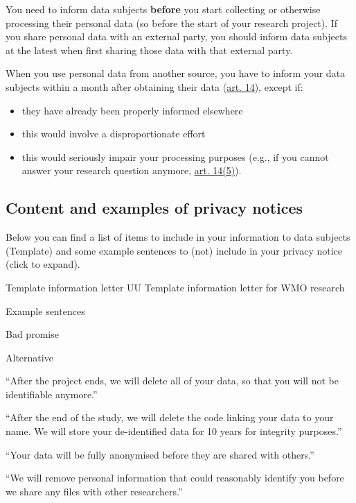\documentclass[
]{book}
\providecommand{\tightlist}{%
  \setlength{\itemsep}{0pt}\setlength{\parskip}{0pt}}
\begin{document}
You need to inform data subjects \textbf{before} you start collecting or otherwise
processing their personal data (so before the start of your research project).
If you share personal data with an external party, you should inform data
subjects at the latest when first sharing those data with that external party.

When you use personal data from another source, you have to inform your data
subjects within a month after obtaining their data
(\href{https://gdpr-info.eu/art-14-gdpr/}{art. 14}), except if:

\begin{itemize}
\tightlist
\item
  they have already been properly informed elsewhere
\item
  this would involve a disproportionate effort
\item
  this would seriously impair your processing purposes (e.g., if you cannot
  answer your research question anymore,
  \href{https://gdpr-info.eu/art-14-gdpr/}{art. 14(5)}).
\end{itemize}

\hypertarget{content-and-examples-of-privacy-notices}{%
\subsection{Content and examples of privacy notices}\label{content-and-examples-of-privacy-notices}}

Below you can find a list of items to include in your information to data
subjects (Template) and some example sentences to (not) include in your privacy
notice (click to expand).

Template information letter UU
Template information letter for WMO research

Example sentences

Bad promise

Alternative

``After the project ends, we will delete all of your data, so that you will not be identifiable anymore.''

``After the end of the study, we will delete the code linking your data to your name. We will store your de-identified data for 10 years for integrity purposes.''

``Your data will be fully anonymised before they are shared with others.''

``We will remove personal information that could reasonably identify you before we share any files with other researchers.''
\end{document}
